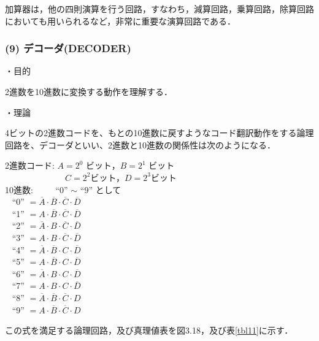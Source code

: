 加算器は，他の四則演算を行う回路，すなわち，減算回路，乗算回路，除算回路においても用いられるなど，非常に重要な演算回路である．

\subsubsection*{(9) デコーダ(DECODER)}
\noindent
・目的 \vspace{2mm}

2進数を10進数に変換する動作を理解する．

\vspace{7mm}
\noindent
・理論 \vspace{2mm}

4ビットの2進数コードを、もとの10進数に戻すようなコード翻訳動作をする論理回路を、デコーダといい、2進数と10進数の関係性は次のようになる．

\newpage
\begin{center}
    2進数コード:
    $A = 2^0$ ビット，$B = 2^1$ ビット \\
    $\;\;\;\;\;\;\;\;\;\;\;\;\;\;\;\;\;\;\;\;\;\;\;\;$ $C = 2^2$ビット，$D = 2^3$ビット　\\
    10進数: $\;\;\;\;\;\;\;$ ``0'' $\sim$ ``9'' として $\;\;\;\;\;\;\;\;\;\;\;\;\;\;\;\;\;\;\;\;$ \\
    $\;\:$ ``0'' $= \overline{A} \cdot \overline{B} \cdot \overline{C} \cdot \overline{D}$\\
    $\;\:$ ``1'' $= A \cdot \overline{B} \cdot \overline{C} \cdot \overline{D}$ \\
    $\;\:$ ``2'' $= \overline{A} \cdot B \cdot \overline{C} \cdot \overline{D}$ \\
    $\;\:$ ``3'' $= A \cdot B \cdot \overline{C} \cdot \overline{D}$ \\
    $\;\:$ ``4'' $= \overline{A} \cdot \overline{B} \cdot C \cdot \overline{D}$ \\
    $\;\:$ ``5'' $= A \cdot \overline{B} \cdot C \cdot \overline{D}$ \\
    $\;\:$ ``6'' $= \overline{A} \cdot B \cdot C \cdot \overline{D}$ \\
    $\;\:$ ``7'' $= A \cdot B \cdot C \cdot \overline{D}$ \\
    $\;\:$ ``8'' $= \overline{A} \cdot \overline{B} \cdot \overline{C} \cdot D$ \\
    $\;\:$ ``9'' $= A \cdot \overline{B} \cdot \overline{C} \cdot D$
\end{center}
\vspace{3mm}
この式を満足する論理回路，及び真理値表を図3.18，及び表\ref{tbl11}に示す．

